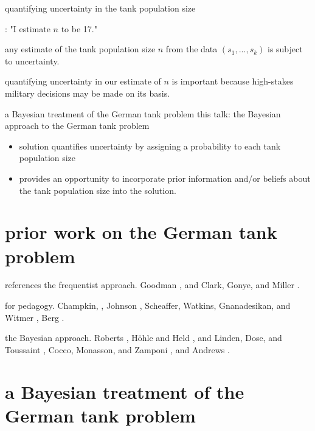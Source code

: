 \documentclass[10pt]{beamer}
\newcommand{\data}{$(s_1, ..., s_k)$\xspace}
\begin{document}
\begin{frame}[t]{quantifying uncertainty in the tank population size}

: "I estimate $n$ to be 17."

\pause 
{}

\pause
 any estimate of the tank population size $n$ from the data \data is subject to uncertainty.

\pause 
quantifying uncertainty in our estimate of $n$ is important because high-stakes military decisions may be made on its basis.

\end{frame}

\begin{frame}[t]{a Bayesian treatment of the German tank problem}
	\alert{this talk}: the Bayesian approach to the German tank problem 
	\begin{itemize}
		\item solution quantifies uncertainty by assigning a probability to each tank population size
		\pause 
		\item provides an opportunity to incorporate prior information and/or beliefs about the tank population size into the solution.
	\end{itemize}
\end{frame}

\section{prior work on the German tank problem}


\begin{frame}[t]{references}
\alert{the frequentist approach.}
Goodman , and Clark, Gonye, and Miller . 

\alert{for pedagogy.} Champkin, ,
Johnson ,
Scheaffer, Watkins, Gnanadesikan, and Witmer , Berg .

\alert{the Bayesian approach.}
Roberts , H{\"o}hle and Held , and Linden, Dose, and Toussaint , Cocco, Monasson, and Zamponi , and Andrews .
\end{frame}


\section{a Bayesian treatment of the German tank problem}
\end{document}
